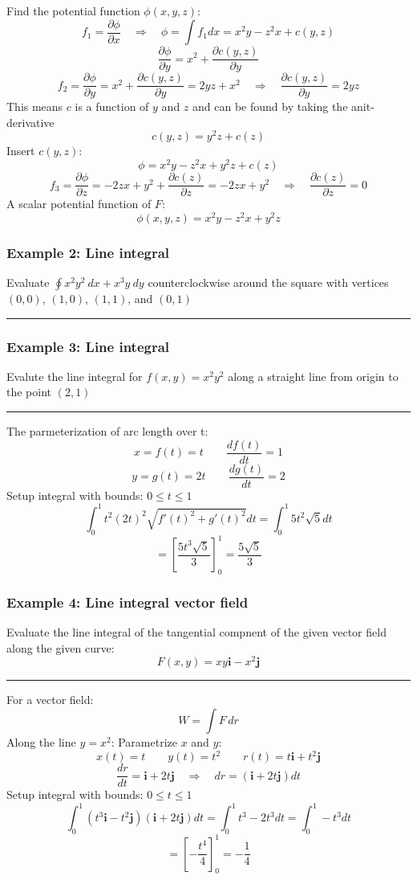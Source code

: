 Find the potential function $\phi(x,y,z)$:
$$f_1=\frac{\partial \phi}{\partial x}\quad\Rightarrow\quad \phi=\int f_1dx=x^2y-z^2x+c(y,z)$$
$$\frac{\partial \phi}{\partial y}=x^2+\frac{\partial c(y,z)}{\partial y}$$
$$f_2=\frac{\partial \phi}{\partial y}=x^2+\frac{\partial c(y,z)}{\partial y}=2yz+x^2\quad\Rightarrow\quad\frac{\partial c(y,z)}{\partial y}=2yz$$ This means $c$ is a function of $y$ and $z$ and can be found by taking the anit-derivative
$$c(y,z)=y^2z+c(z)$$
Insert $c(y,z)$:
$$\phi=x^2y-z^2x+y^2z+c(z)$$
$$f_3=\frac{\partial \phi}{\partial z}=-2zx+y^2+\frac{\partial c(z)}{\partial z}=-2zx+y^2\quad\Rightarrow\quad \frac{\partial c(z)}{\partial z}=0$$
A scalar potential function of $F$:
$$\phi(x,y,z)=x^2y-z^2x+y^2z$$

\subsubsection{Example 2: Line integral}
Evaluate $\oint x^2y^2 \ dx + x^3y\ dy$ counterclockwise around the square with vertices
$(0,0)$, $(1,0)$, $(1, 1)$, and $(0, 1)$

\rule{\textwidth}{0.5pt}

\subsubsection{Example 3: Line integral}
Evalute the line integral for $f(x,y)=x^2y^2$ along a straight line from origin to the point $(2,1)$

\rule{\textwidth}{0.5pt}

The parmeterization of arc length over t:
$$x=f(t)=t\qquad \frac{df(t)}{dt}=1$$
$$y=g(t)=2t\qquad \frac{dg(t)}{dt}=2$$
Setup integral with bounds: $0\leq t\leq 1$
$$\int_0^1 t^2(2t)^2\sqrt{f'(t)^2+g'(t)^2}dt=\int_0^1 5t^2\sqrt{5}dt$$
$$=\left[\frac{5t^3\sqrt{5}}{3}\right]^1_0=\frac{5\sqrt{5}}{3}$$

\subsubsection{Example 4: Line integral vector field}
Evaluate the line integral of the tangential compnent of the given vector field along the given curve:
$$F(x,y)=xy\mathbf{i}-x^2\mathbf{j}$$
\rule{\textwidth}{0.5pt}

For a vector field:
$$W=\int F \,dr$$
Along the line $y=x^2$:
Parametrize $x$ and $y$:
$$x(t)=t\qquad y(t)=t^2\qquad r(t)=t\mathbf{i}+t^2\mathbf{j}$$
$$\frac{dr}{dt}=\mathbf{i}+2t\mathbf{j}\quad\Rightarrow\quad dr=(\mathbf{i}+2t\mathbf{j})dt$$
Setup integral with bounds: $0\leq t\leq 1$
$$\int_{0}^{1}(t^3\mathbf{i}-t^2\mathbf{j})(\mathbf{i}+2t\mathbf{j})  dt=\int_0^1t^3-2t^3dt=\int_0^1-t^3dt$$
$$=\left[-\frac{t^4}{4}\right]_0^1=-\frac{1}{4}$$

